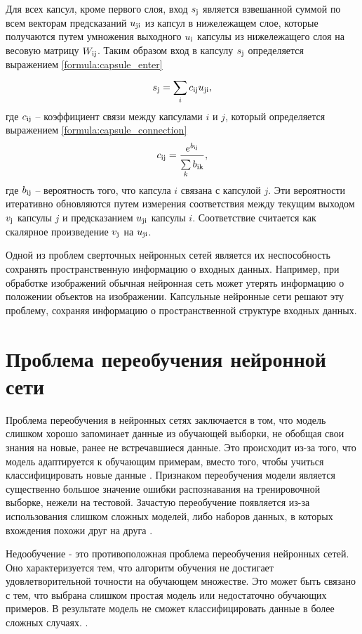 Для всех капсул, кроме первого слоя, вход $s_{\rm{j}}$ является взвешанной суммой по всем векторам предсказаний $u_{\rm{ji}}$ из капсул в нижележащем слое, которые получаются путем умножения выходного $u_{\rm{i}}$ капсулы из нижележащего слоя на весовую матрицу $W_{\rm{ij}}$. Таким образом вход в капсулу $s_{\rm{j}}$ определяется выражением \ref{formula:capsule_enter}
\begin{equation}\label{formula:capsule_enter}
s_{\rm{j}} = \sum\limits_{i}^{}c_{\rm{ij}}u_{\rm{ji}},
\end{equation}
где $c_{\rm{ij}}$ -- коэффициент связи между капсулами $i$ и $j$, который определяется выражением \ref{formula:capsule_connection}
\begin{equation}\label{formula:capsule_connection}
c_{\rm{ij}} = \frac{e^{b_{\rm{ij}}}}{\sum\limits_{k}^{}b_{\rm{ik}}},
\end{equation}
где $b_{\rm{ij}}$ -- вероятность того, что капсула $i$ связана с капсулой $j$. Эти вероятности итеративно обновляются путем измерения соответствия между текущим выходом $v_{\rm{j}}$ капсулы $j$ и предсказанием $u_{\rm{ji}}$ капсулы $i$. Соответствие считается как скалярное произведение $v_{\rm{j}}$ на $u_{\rm{ji}}$.

Одной из проблем сверточных нейронных сетей является их неспособность сохранять пространственную информацию о входных данных. Например, при обработке изображений обычная нейронная сеть может утерять информацию о положении объектов на изображении. Капсульные нейронные сети решают эту проблему, сохраняя информацию о пространственной структуре входных данных.

\section{Проблема переобучения нейронной сети}\label{sec:retraining}
Проблема переобучения в нейронных сетях заключается в том, что модель слишком хорошо запоминает данные из обучающей выборки, не обобщая свои знания на новые, ранее не встречавшиеся данные. Это происходит из-за того, что модель адаптируется к обучающим примерам, вместо того, чтобы учиться классифицировать новые данные \cite{overtraining1}. Признаком переобучения модели является существенно большое значение ошибки распознавания на тренировочной выборке, нежели на тестовой. Зачастую переобучение появляется из-за использования слишком сложных моделей, либо наборов данных, в которых вхождения похожи друг на друга \cite{overtraining1}.

Недообучение - это противоположная проблема переобучения нейронных сетей. Оно характеризуется тем, что алгоритм обучения не достигает удовлетворительной точности на обучающем множестве. Это может быть связано с тем, что выбрана слишком простая модель или недостаточно обучающих примеров. В результате модель не сможет классифицировать данные в более сложных случаях. \cite{overtraining1}.

